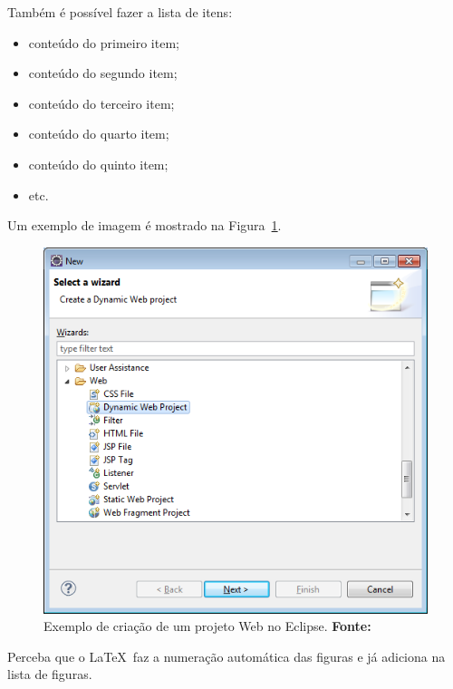 \par Também é possível fazer a lista de itens:

\begin{itemize}
  \item conteúdo do primeiro item;
  \item conteúdo do segundo item;
  \item conteúdo do terceiro item;
  \item conteúdo do quarto item;
  \item conteúdo do quinto item;
  \item etc.
\end{itemize}

\par Um exemplo de imagem é mostrado na Figura~\ref{fig:exemplo1}.

\begin{figure}[h!]
  \centerline{\includegraphics[scale=0.65]{./imagens/apendice_img1.png}}
  \caption[Exemplo de criação de um projeto Web no Eclipse]
          {Exemplo de criação de um projeto Web no Eclipse. \textbf{Fonte:} \cite{correa2003plantas}}
\label{fig:exemplo1}
\end{figure}

\par Perceba que o \LaTeX~faz a numeração automática das figuras e já adiciona na lista de figuras.

